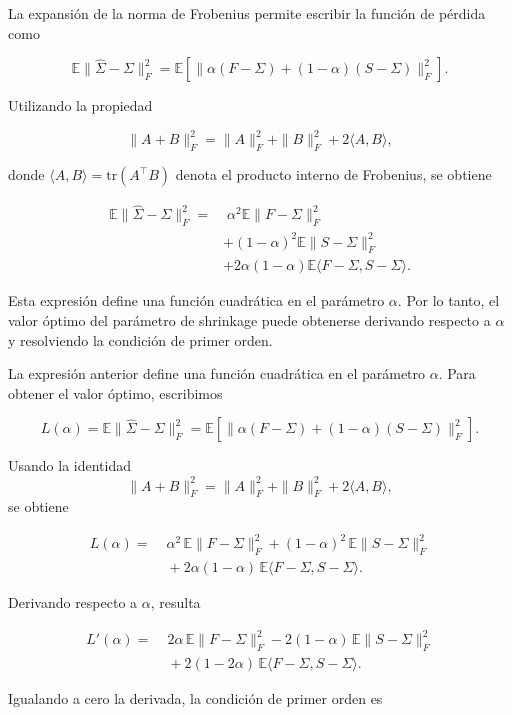 \documentclass[letterpaper,12pt,oneside]{book}
\begin{document}
La expansión de la norma de Frobenius permite escribir la función de pérdida como

\[
\mathbb{E}\|\hat{\Sigma}-\Sigma\|_F^2
=
\mathbb{E}\left[
\|
\alpha(F-\Sigma) + (1-\alpha)(S-\Sigma)
\|_F^2
\right].
\]

Utilizando la propiedad

\[
\|A+B\|_F^2
=
\|A\|_F^2
+
\|B\|_F^2
+
2\langle A,B\rangle,
\]

donde $\langle A,B\rangle = \mathrm{tr}(A^\top B)$ denota el producto interno de Frobenius, se obtiene

\[
\begin{aligned}
\mathbb{E}\|\hat{\Sigma}-\Sigma\|_F^2
=
&\;
\alpha^2
\mathbb{E}\|F-\Sigma\|_F^2
\\
&+
(1-\alpha)^2
\mathbb{E}\|S-\Sigma\|_F^2
\\
&+
2\alpha(1-\alpha)
\mathbb{E}\langle F-\Sigma,S-\Sigma\rangle .
\end{aligned}
\]

Esta expresión define una función cuadrática en el parámetro $\alpha$. Por lo tanto, el valor óptimo del parámetro de shrinkage puede obtenerse derivando respecto a $\alpha$ y resolviendo la condición de primer orden.

La expresión anterior define una función cuadrática en el parámetro $\alpha$. Para obtener el valor óptimo, escribimos

\[
L(\alpha)
=
\mathbb{E}\|\hat{\Sigma}-\Sigma\|_F^2
=
\mathbb{E}\left[
\|
\alpha(F-\Sigma) + (1-\alpha)(S-\Sigma)
\|_F^2
\right].
\]

Usando la identidad
\[
\|A+B\|_F^2
=
\|A\|_F^2+\|B\|_F^2+2\langle A,B\rangle,
\]
se obtiene

\[
\begin{aligned}
L(\alpha)
=
&\;
\alpha^2 \,\mathbb{E}\|F-\Sigma\|_F^2
+
(1-\alpha)^2 \,\mathbb{E}\|S-\Sigma\|_F^2 \\
&\;+
2\alpha(1-\alpha)\,\mathbb{E}\langle F-\Sigma,S-\Sigma\rangle.
\end{aligned}
\]

Derivando respecto a $\alpha$, resulta

\[
\begin{aligned}
L'(\alpha)
=
&\;
2\alpha \,\mathbb{E}\|F-\Sigma\|_F^2
-2(1-\alpha)\,\mathbb{E}\|S-\Sigma\|_F^2 \\
&\;+
2(1-2\alpha)\,\mathbb{E}\langle F-\Sigma,S-\Sigma\rangle.
\end{aligned}
\]

Igualando a cero la derivada, la condición de primer orden es
\end{document}
